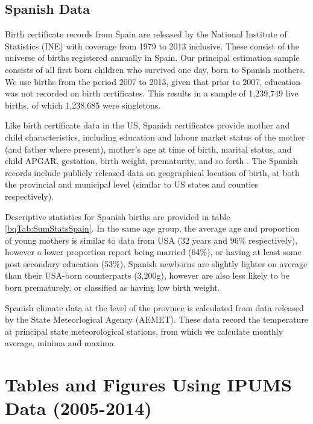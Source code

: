 \documentclass[a4paper, 12 pt]{article}
\theoremstyle{plain}
\begin{document}
\begin{doublespace}
\subsection{Spanish Data}

Birth certificate records from Spain are released by the National Institute of Statistics (INE)
with coverage from 1979 to 2013 inclusive. These consist of the universe of
births registered annually in Spain. Our principal estimation sample consists of
all first born children who survived one day, born to Spanish mothers. We use
births from the period 2007 to 2013, given that prior to 2007, education was not
recorded on birth certificates.  This results in a sample of 1,239,749 live
births, of which 1,238,685 were singletons.

Like birth certificate data in the US, Spanish certificates provide mother
and child characteristics, including education and labour market status of the
mother (and father where present), mother's age at time of birth, marital
status, and child APGAR, gestation, birth weight, prematurity, and so forth
\citep{INE2013}.  The Spanish records include publicly released data on
geographical location of birth, at both the provincial and municipal level
(similar to US states and counties respectively).

Descriptive statistics for Spanish births are provided in table \ref{bqTab:SumStatsSpain}.  In the same
age group, the average age and proportion of young mothers is similar to data
from USA (32 years and 96\% respectively), however a lower proportion report
being married (64\%), or having at least some post secondary education (53\%).
Spanish newborns are slightly lighter on average than their USA-born
counterparts (3,200g), however are also less likely to be born prematurely,
or classified as having low birth weight.

Spanish climate data at the level of the province is calculated from data released by the State Meteorlogical
Agency (AEMET). These data record the temperature at principal state
meteorological stations, from which we calculate monthly average, minima and
maxima.


\section{Tables and Figures Using IPUMS Data (2005-2014)}
\setcounter{figure}{0}  
\renewcommand\thefigure{A.\arabic{figure}}
\setcounter{table}{0}
\renewcommand\thetable{A.\arabic{table}}





\end{doublespace}
\end{document}
